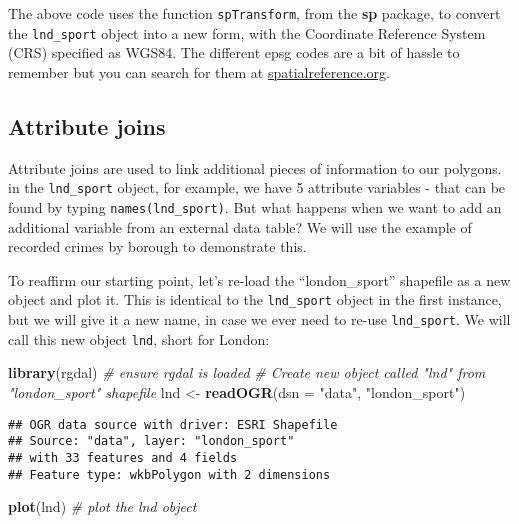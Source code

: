 \documentclass[]{article}
\newenvironment{Shaded}{}{}
\newcommand{\KeywordTok}[1]{\textcolor[rgb]{0.00,0.44,0.13}{\textbf{{#1}}}}
\newcommand{\DataTypeTok}[1]{\textcolor[rgb]{0.56,0.13,0.00}{{#1}}}
\newcommand{\StringTok}[1]{\textcolor[rgb]{0.25,0.44,0.63}{{#1}}}
\newcommand{\CommentTok}[1]{\textcolor[rgb]{0.38,0.63,0.69}{\textit{{#1}}}}
\newcommand{\NormalTok}[1]{{#1}}
\begin{document}
The above code uses the function \texttt{spTransform}, from the
\textbf{sp} package, to convert the \texttt{lnd\_sport} object into a
new form, with the Coordinate Reference System (CRS) specified as WGS84.
The different epsg codes are a bit of hassle to remember but you can
search for them at
\href{http://spatialreference.org/}{spatialreference.org}.

\subsection{Attribute joins}\label{attribute-joins}

Attribute joins are used to link additional pieces of information to our
polygons. in the \texttt{lnd\_sport} object, for example, we have 5
attribute variables - that can be found by typing
\texttt{names(lnd\_sport)}. But what happens when we want to add an
additional variable from an external data table? We will use the example
of recorded crimes by borough to demonstrate this.

To reaffirm our starting point, let's re-load the ``london\_sport''
shapefile as a new object and plot it. This is identical to the
\texttt{lnd\_sport} object in the first instance, but we will give it a
new name, in case we ever need to re-use \texttt{lnd\_sport}. We will
call this new object \texttt{lnd}, short for London:

\begin{Shaded}
\begin{Highlighting}[]
\KeywordTok{library}\NormalTok{(rgdal) }\CommentTok{# ensure rgdal is loaded}
\CommentTok{# Create new object called "lnd" from "london_sport" shapefile}
\NormalTok{lnd <-}\StringTok{ }\KeywordTok{readOGR}\NormalTok{(}\DataTypeTok{dsn =} \StringTok{"data"}\NormalTok{, }\StringTok{"london_sport"}\NormalTok{)}
\end{Highlighting}
\end{Shaded}

\begin{verbatim}
## OGR data source with driver: ESRI Shapefile 
## Source: "data", layer: "london_sport"
## with 33 features and 4 fields
## Feature type: wkbPolygon with 2 dimensions
\end{verbatim}

\begin{Shaded}
\begin{Highlighting}[]
\KeywordTok{plot}\NormalTok{(lnd) }\CommentTok{# plot the lnd object}
\end{Highlighting}
\end{Shaded}
\end{document}
